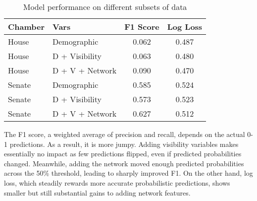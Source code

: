 \begin{table}
\centering
   \begin{tabular}{llcc}
   \toprule
   Chamber & Vars & F1 Score & Log Loss \\ \midrule
   House & Demographic & 0.062 & 0.487 \\
   House & D + Visibility & 0.063 & 0.480 \\
   House & D + V + Network & 0.090 & 0.470 \\
   Senate & Demographic & 0.585 & 0.524 \\
   Senate & D + Visibility & 0.573 & 0.523 \\ 
   Senate & D + V + Network & 0.627 & 0.512 \\ \bottomrule
   \end{tabular}
   \caption{Model performance on different subsets of data}
   \label{table:perf}
\end{table}

The F1 score, a weighted average of precision and recall, depends on the actual 0-1 predictions. As a result, it is more jumpy. Adding visibility variables makes essentially no impact as few predictions flipped, even if predicted probabilities changed. Meanwhile, adding the network moved enough predicted probabilities across the 50\% threshold, leading to sharply improved F1. On the other hand, log loss, which steadily rewards more accurate probabilistic predictions, shows smaller but still substantial gains to adding network features.
